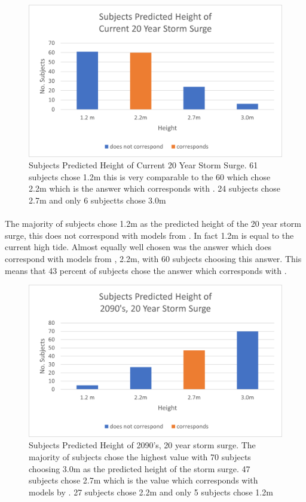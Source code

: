 \begin{figure}[h]
    \centering
    \includegraphics{fig_results/2022-20yrss-answer.png}
    \caption{Subjects Predicted Height of Current 20 Year Storm Surge. 61 subjects chose 1.2m this is very comparable to the 60 which chose 2.2m which is the answer which corresponds with \cite{kartverket_se_2021}. 24 subjects chose 2.7m and only 6 subjectts chose 3.0m}
    \label{fig:2022-stormsurge-answers}
\end{figure}
\paragraph{}
The majority of subjects chose 1.2m as the predicted height of the 20 year storm surge, this does not correspond with models from \cite{kartverket_se_2021}. In fact 1.2m is equal to the current high tide. Almost equally well chosen was the answer which does correspond with models from \cite{kartverket_se_2021}, 2.2m, with 60 subjects choosing this answer. This means that 43 percent of subjects chose the answer which corresponds with \cite{kartverket_se_2021}.

\begin{figure}[h]
    \centering
    \includegraphics{fig_results/2090s 20yr ss answers.png}
    \caption{Subjects Predicted Height of 2090's, 20 year storm surge. The majority of subjects chose the highest value with 70 subjects choosing 3.0m as the predicted height of the storm surge. 47 subjects chose 2.7m which is the value which corresponds with models by \cite{kartverket_se_2021}. 27 subjects chose 2.2m and only 5 subjects chose 1.2m}
    \label{fig:2090-stormsurge-answers}
\end{figure}
